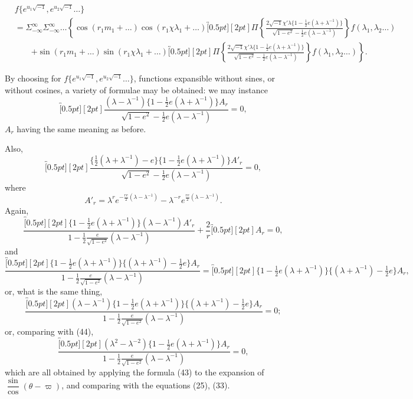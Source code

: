 \documentclass[11pt]{article}
\providecommand{\br}[1]{\overbracket[0.5pt][2pt]{#1}}
\providecommand{\half}{\tfrac12}
\begin{document}
\begin{equation}
\begin{aligned}
&f\{e^{u_1\sqrt{-1}},e^{u_2\sqrt{-1}}\ldots\}\\
&=\Sigma_{-\infty}^{\infty}\Sigma_{-\infty}^{\infty}\ldots
\left\{
\cos(r_1m_1+\ldots)\cos(r_1\chi\lambda_1+\ldots)
\br{\Pi\left\{
\frac{2\sqrt{-1}\chi'\lambda\{1-\half e(\lambda+\lambda^{-1})\}}
{\sqrt{1-e^{2}}-\half e(\lambda-\lambda^{-1})}\right\}f(\lambda_1,\lambda_2\ldots)}
\right.\\
&\qquad\left.
+\sin(r_1m_1+\ldots)\sin(r_1\chi\lambda_1+\ldots)
\br{\Pi\left\{
\frac{2\sqrt{-1}\chi'\lambda\{1-\half e(\lambda+\lambda^{-1})\}}
{\sqrt{1-e^{2}}-\half e(\lambda-\lambda^{-1})}\right\}f(\lambda_1,\lambda_2\ldots)}
\right\}.
\end{aligned}\tag{43}
\end{equation}

\clearpage

By choosing for $f\{e^{u_1\sqrt{-1}},e^{u_2\sqrt{-1}}\ldots\}$, functions expansible
without sines, or without cosines, a variety of formulae may be obtained: we may
instance
\[
\br{\frac{(\lambda-\lambda^{-1})\{1-\half e(\lambda+\lambda^{-1})\}A_r}
{\sqrt{1-e^{2}}-\half e(\lambda-\lambda^{-1})}}=0 \tag{44},
\]
$A_r$ having the same meaning as before.

Also,
\[
\br{\frac{\{\half(\lambda+\lambda^{-1})-e\}\{1-\half e(\lambda+\lambda^{-1})\}A'_r}
{\sqrt{1-e^{2}}-\half e(\lambda-\lambda^{-1})}}=0, \tag{45}
\]
where
\[
A'_r=\lambda^{r}e^{-\frac{re}{2}(\lambda-\lambda^{-1})}
-\lambda^{-r}e^{\frac{re}{2}(\lambda-\lambda^{-1})}. \tag{46}
\]
Again,
\[
\frac{\br{\{1-\half e(\lambda+\lambda^{-1})\}(\lambda-\lambda^{-1})A'_r}}
{1-\half\frac{e}{\sqrt{1-e^{2}}}(\lambda-\lambda^{-1})}
+\frac{2}{r}\br{A_r}=0 \tag{47},
\]
and
\[
\frac{\br{\{1-\half e(\lambda+\lambda^{-1})\}\{(\lambda+\lambda^{-1})-\half e\}A_r}}
{1-\half\frac{e}{\sqrt{1-e^{2}}}(\lambda-\lambda^{-1})}
=
\br{\{1-\half e(\lambda+\lambda^{-1})\}\{(\lambda+\lambda^{-1})-\half e\}A_r},
\tag{48}
\]
or, what is the same thing,
\[
\frac{\br{(\lambda-\lambda^{-1})\{1-\half e(\lambda+\lambda^{-1})\}\{(\lambda+\lambda^{-1})-\half e\}A_r}}
{1-\half\frac{e}{\sqrt{1-e^{2}}}(\lambda-\lambda^{-1})}=0; \tag{49}
\]
or, comparing with (44),
\[
\frac{\br{(\lambda^{2}-\lambda^{-2})\{1-\half e(\lambda+\lambda^{-1})\}A_r}}
{1-\half\frac{e}{\sqrt{1-e^{2}}}(\lambda-\lambda^{-1})}=0, \tag{50}
\]
which are all obtained by applying the formula (43) to the expansion of
$\dfrac{\sin}{\cos}(\theta-\varpi)$, and comparing with the equations (25), (33).
\end{document}
